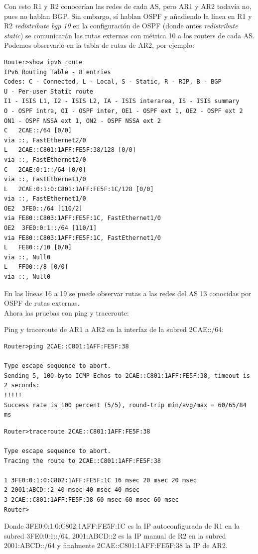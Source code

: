 \documentclass{article}
\begin{document}
Con esto R1 y R2 conocerían las redes de cada AS, pero AR1 y AR2 todavía no, pues no hablan BGP. Sin embargo, sí hablan OSPF y añadiendo la línea en R1 y R2 \textit{redistribute bgp 10} en la configuración de OSPF (donde antes \textit{redistribute static}) se comunicarán las rutas externas con métrica 10 a los routers de cada AS. Podemos observarlo en la tabla de rutas de AR2, por ejemplo:

\begin{lstlisting}
Router>show ipv6 route
IPv6 Routing Table - 8 entries
Codes: C - Connected, L - Local, S - Static, R - RIP, B - BGP
U - Per-user Static route
I1 - ISIS L1, I2 - ISIS L2, IA - ISIS interarea, IS - ISIS summary
O - OSPF intra, OI - OSPF inter, OE1 - OSPF ext 1, OE2 - OSPF ext 2
ON1 - OSPF NSSA ext 1, ON2 - OSPF NSSA ext 2
C   2CAE::/64 [0/0]
via ::, FastEthernet2/0
L   2CAE::C801:1AFF:FE5F:38/128 [0/0]
via ::, FastEthernet2/0
C   2CAE:0:1::/64 [0/0]
via ::, FastEthernet1/0
L   2CAE:0:1:0:C801:1AFF:FE5F:1C/128 [0/0]
via ::, FastEthernet1/0
OE2  3FE0::/64 [110/2]
via FE80::C803:1AFF:FE5F:1C, FastEthernet1/0
OE2  3FE0:0:1::/64 [110/1]
via FE80::C803:1AFF:FE5F:1C, FastEthernet1/0
L   FE80::/10 [0/0]
via ::, Null0
L   FF00::/8 [0/0]
via ::, Null0
\end{lstlisting}

En las líneas 16 a 19 se puede observar rutas a las redes del AS 13 conocidas por OSPF de rutas externas.
\\

Ahora las pruebas con ping y traceroute:

Ping y traceroute de AR1 a AR2 en la interfaz de la subred 2CAE::/64:
\begin{lstlisting}
Router>ping 2CAE::C801:1AFF:FE5F:38

Type escape sequence to abort.
Sending 5, 100-byte ICMP Echos to 2CAE::C801:1AFF:FE5F:38, timeout is 2 seconds:
!!!!!
Success rate is 100 percent (5/5), round-trip min/avg/max = 60/65/84 ms
\end{lstlisting}
\begin{lstlisting}
Router>traceroute 2CAE::C801:1AFF:FE5F:38

Type escape sequence to abort.
Tracing the route to 2CAE::C801:1AFF:FE5F:38

1 3FE0:0:1:0:C802:1AFF:FE5F:1C 16 msec 20 msec 20 msec
2 2001:ABCD::2 40 msec 40 msec 40 msec
3 2CAE::C801:1AFF:FE5F:38 60 msec 60 msec 60 msec
Router>
\end{lstlisting}

Donde 3FE0:0:1:0:C802:1AFF:FE5F:1C es la IP autoconfigurada de R1 en la subred 3FE0:0:1::/64, 2001:ABCD::2 es la IP manual de R2 en la subred 2001:ABCD::/64 y finalmente 2CAE::C801:1AFF:FE5F:38 la IP de AR2.
\end{document}
